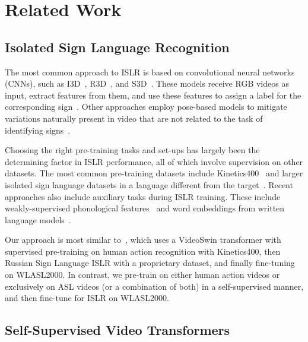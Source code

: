 \section{Related Work}
\label{sec:related-work}

\subsection{Isolated Sign Language Recognition}
\label{sec:related-work-islr}

The most common approach to ISLR is based on convolutional neural networks (CNNs), such as I3D~\cite{carreira2017quo}, R3D~\cite{hara2017learning}, and S3D~\cite{xie2018rethinking}. These models receive RGB videos as input, extract features from them, and use these features to assign a label for the corresponding sign~\cite{Albanie2020BSL1K, Varol2021BSL1KImp, zuo2023natural}. Other approaches employ pose-based models to mitigate variations naturally present in video that are not related to the task of identifying signs~\cite{jiang2021skeleton, jiang2021sign, Dafnis2022Bidirectional}.

Choosing the right pre-training tasks and set-ups has largely been the determining factor in ISLR performance, all of which involve supervision on other datasets. The most common pre-training datasets include Kinetics400~\cite{carreira2017quo} and larger isolated sign language datasets in a language different from the target~\cite{Albanie2020BSL1K, Varol2021BSL1KImp, Novopoltsev2023Finetuning}. Recent approaches also include auxiliary tasks during ISLR training. These include weakly-supervised phonological features~\cite{kezar2023improving} and word embeddings from written language models~\cite{zuo2023natural}.

Our approach is most similar to~\cite{Novopoltsev2023Finetuning}, which uses a VideoSwin transformer with supervised pre-training on human action recognition with Kinetics400, then Russian Sign Language ISLR with a proprietary dataset, and finally fine-tuning on WLASL2000. In contrast, we pre-train on either human action videos or exclusively on ASL videos (or a combination of both) in a self-supervised manner, and then fine-tune for ISLR on WLASL2000.

\subsection{Self-Supervised Video Transformers}
\label{sec:related-work:-self-supervised-video-transformers}

